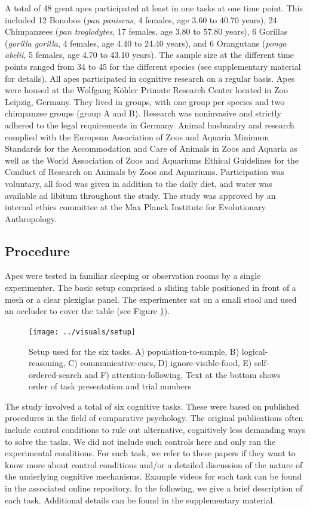 \documentclass[
  man,floatsintext]{apa6}
\begin{document}
A total of 48 great apes participated at least in one tasks at one time point. This included 12 Bonobos (\emph{pan paniscus}, 4 females, age 3.60 to 40.70 years), 24 Chimpanzees (\emph{pan troglodytes}, 17 females, age 3.80 to 57.80 years), 6 Gorillas (\emph{gorilla gorilla}, 4 females, age 4.40 to 24.40 years), and 6 Orangutans (\emph{pongo abelii}, 5 females, age 4.70 to 43.10 years). The sample size at the different time points ranged from 34 to 45 for the different species (see supplementary material for details). All apes participated in cognitive research on a regular basis. Apes were housed at the Wolfgang Köhler Primate Research Center located in Zoo Leipzig, Germany. They lived in groups, with one group per species and two chimpanzee groups (group A and B). Research was noninvasive and strictly adhered to the legal requirements in Germany. Animal husbandry and research complied with the European Association of Zoos and Aquaria Minimum Standards for the Accommodation and Care of Animals in Zoos and Aquaria as well as the World Association of Zoos and Aquariums Ethical Guidelines for the Conduct of Research on Animals by Zoos and Aquariums. Participation was voluntary, all food was given in addition to the daily diet, and water was available ad libitum throughout the study. The study was approved by an internal ethics committee at the Max Planck Institute for Evolutionary Anthropology.

\hypertarget{procedure}{%
\subsection{Procedure}\label{procedure}}

Apes were tested in familiar sleeping or observation rooms by a single experimenter. The basic setup comprised a sliding table positioned in front of a mesh or a clear plexiglas panel. The experimenter sat on a small stool and used an occluder to cover the table (see Figure \ref{fig:setup}).

\begin{figure}
\texttt{[image: ../visuals/setup]} \caption{Setup used for the six tasks. A) population-to-sample, B) logical-reasoning, C) communicative-cues, D) ignore-visible-food, E) self-ordered-search and F) attention-following. Text at the bottom shows order of task presentation and trial numbers}\label{fig:setup}
\end{figure}

The study involved a total of six cognitive tasks. These were based on published procedures in the field of comparative psychology. The original publications often include control conditions to rule out alternative, cognitively less demanding ways to solve the tasks. We did not include such controls here and only ran the experimental conditions. For each task, we refer to these papers if they want to know more about control conditions and/or a detailed discussion of the nature of the underlying cognitive mechanisms. Example videos for each task can be found in the associated online repository. In the following, we give a brief description of each task. Additional details can be found in the supplementary material.
\end{document}
